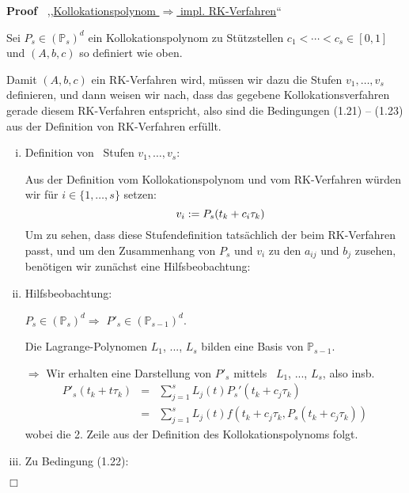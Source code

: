 \documentclass{book}
\newcommand{\assign}{:=}
\newcommand{\textdots}{...}
\newenvironment{enumerateroman}{\begin{enumerate}[i.] }{\end{enumerate}}
\newenvironment{proof}{\noindent\textbf{Proof\ }}{\hspace*{\fill}$\Box$\medskip}
\begin{document}
\begin{proof}
  ,,{\underline{Kollokationspolynom $\Rightarrow$ impl. RK-Verfahren}}``
  
  Sei $P_s \in (\mathbb{P}_s)^d$ ein Kollokationspolynom zu St{\"u}tzstellen
  $c_1 < \cdots < c_s \in [0, 1]$ und $(A, b, c)$ so definiert wie oben.
  
  Damit $(A, b, c)$ ein RK-Verfahren wird, m{\"u}ssen wir dazu die Stufen
  $v_1, \ldots, v_s$ definieren, und dann weisen wir nach, dass das gegebene
  Kollokationsverfahren gerade diesem RK-Verfahren entspricht, also sind die
  Bedingungen (1.21) -- (1.23) aus der Definition von RK-Verfahren
  erf{\"u}llt.
  \begin{enumerateroman}
    \item Definition von \ Stufen $v_1, \ldots, v_s$:
    
    Aus der Definition vom Kollokationspolynom und vom RK-Verfahren
    w{\"u}rden wir f{\"u}r $i \in \{ 1, \ldots, s \}$ setzen: \
    \[ \text{\quad} v_i \assign P_s (t_k + c_i \tau_k) \]
    {\hspace{1.7em}}Um zu sehen, dass diese Stufendefinition tats{\"a}chlich
    der beim RK-Verfahren passt, und um den Zusammenhang von $P_s$ und $v_i$
    zu den $a_{i j}$ und $b_j$ zusehen, ben{\"o}tigen wir zun{\"a}chst eine
    Hilfsbeobachtung:
    
    \item Hilfsbeobachtung:
    
    $P_s \in (\mathbb{P}_s)^d$\quad$\Rightarrow$ $P'_s \in (\mathbb{P}_{s -
    1})^d$.
    
    Die Lagrange-Polynomen $L_1$, {\textdots}, $L_s$ bilden eine Basis von
    $\mathbb{P}_{s - 1}$.
    
    $\Rightarrow$ Wir erhalten eine Darstellung von $P'_s$ mittels \ $L_1$,
    {\textdots}, $L_s$, also insb.
    \begin{eqnarray*}
      P'_s (t_k + t \tau_k) & = & \sum_{j = 1}^s L_j (t) P_s' (t_k + c_j
      \tau_k)\\
      & = & \sum_{j = 1 }^s L_j (t) f (t_k + c_j \tau_k, P_s (t_k + c_j
      \tau_k))
    \end{eqnarray*}
    wobei die 2. Zeile aus der Definition des Kollokationspolynoms folgt.
    
    \item Zu Bedingung (1.22):
    

\end{enumerateroman}
\end{proof}
\end{document}
